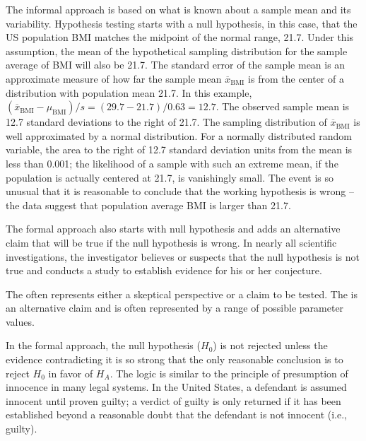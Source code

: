 \begin{spacing}{1.5}
The informal approach is based on what is known about a sample mean and its variability. Hypothesis testing starts with a null hypothesis, in this case, that the US population BMI matches the midpoint of the normal range, 21.7. Under this assumption, the mean of the hypothetical sampling distribution for the sample average of BMI will also be 21.7. The standard error of the sample mean is an approximate measure of how far the sample mean $\overline{x}_{\text{BMI}}$ is from the center of a distribution with population mean 21.7. In this example, $(\overline{x}_{\text{BMI}} - \mu_{\text{BMI}})/s =  (29.7 - 21.7)/0.63 = 12.7$.  The observed sample mean is 12.7 standard deviations to the right of 21.7. The sampling distribution of $\overline{x}_{\text{BMI}}$ is well approximated by a normal distribution. For a normally distributed random variable, the area to the right of 12.7 standard deviation units from the mean is less than 0.001; the likelihood of a sample with such an extreme mean, if the population is actually centered at 21.7, is vanishingly small. The event is so unusual that it is reasonable to conclude that the working hypothesis is wrong -- the data suggest that population average BMI is larger than 21.7.

The formal approach also starts with null hypothesis and adds an alternative claim that will be true if the null hypothesis is wrong. In nearly all scientific investigations, the investigator believes or suspects that the null hypothesis is not true and conducts a study to establish evidence for his or her conjecture.

\begin{termBox}{
{The  often represents either a skeptical perspective or a claim to be tested. The  is an alternative claim and is often represented by a range of possible parameter values.}}
\end{termBox}

In the formal approach, the null hypothesis ($H_0$) is not rejected unless the evidence contradicting it is so strong that the only reasonable conclusion is to reject $H_0$ in favor of $H_A$. The logic is similar to the principle of presumption of innocence in many legal systems. In the United States, a defendant is assumed innocent until proven guilty; a verdict of guilty is only returned if it has been established beyond a reasonable doubt that the defendant is not innocent (i.e., guilty). 


\end{spacing}
